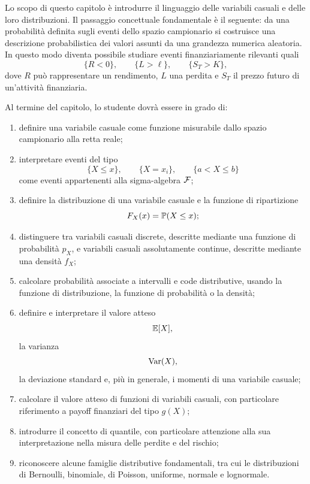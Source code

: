 Lo scopo di questo capitolo \`{e} introdurre il linguaggio delle variabili
casuali e delle loro distribuzioni. Il passaggio concettuale fondamentale
\`{e} il seguente: da una probabilit\`{a} definita sugli eventi dello spazio
campionario si costruisce una descrizione probabilistica dei valori assunti da
una grandezza numerica aleatoria. In questo modo diventa possibile studiare
eventi finanziariamente rilevanti quali
\[
\{R<0\},\qquad\{L>\ell\},\qquad\{S_{T}>K\},
\]
dove $R$ pu\`{o} rappresentare un rendimento, $L$ una perdita e $S_{T}$ il
prezzo futuro di un'attivit\`{a} finanziaria.

Al termine del capitolo, lo studente dovr\`{a} essere in grado di:

\begin{enumerate}
\item definire una variabile casuale come funzione misurabile dallo spazio
campionario alla retta reale;

\item interpretare eventi del tipo
\[
\{X\leq x\},\qquad\{X=x_{i}\},\qquad\{a<X\leq b\}
\]
come eventi appartenenti alla sigma-algebra $\mathcal{F}$;

\item definire la distribuzione di una variabile casuale e la funzione di
ripartizione
\[
F_{X}(x)=\mathbb{P}(X\leq x);
\]


\item distinguere tra variabili casuali discrete, descritte mediante una
funzione di probabilit\`{a} $p_{X}$, e variabili casuali assolutamente continue,
descritte mediante una densit\`{a} $f_{X}$;

\item calcolare probabilit\`{a} associate a intervalli e code distributive,
usando la funzione di distribuzione, la funzione di probabilit\`{a} o la densit\`{a};

\item definire e interpretare il valore atteso
\[
\mathbb{E}[X],
\]
la varianza
\[
\operatorname{Var}(X),
\]
la deviazione standard e, pi\`{u} in generale, i momenti di una variabile casuale;

\item calcolare il valore atteso di funzioni di variabili casuali, con
particolare riferimento a payoff finanziari del tipo $g(X)$;

\item introdurre il concetto di quantile, con particolare attenzione alla sua
interpretazione nella misura delle perdite e del rischio;

\item riconoscere alcune famiglie distributive fondamentali, tra cui le
distribuzioni di Bernoulli, binomiale, di Poisson, uniforme, normale e lognormale.
\end{enumerate}

